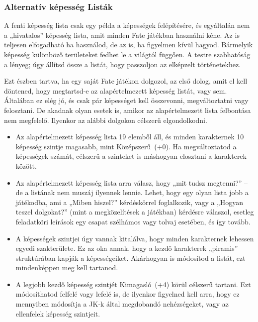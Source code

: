 \subsubsection{Alternatív képesség Listák}

A fenti képesség lista csak egy példa a képességek felépítésére, és egyáltalán nem a „hivatalos” képesség lista, amit minden Fate játékban használni kéne. Az is teljesen elfogadható ha használod, de az is, ha figyelmen kívül hagyod. Bármelyik képesség különböző területeket fedhet le a világtól függően. A testre szabhatóság a lényeg; úgy állítsd össze a listát, hogy passzoljon az elképzelt történetekhez.

Ezt észben tartva, ha egy saját Fate játékon dolgozol, az első dolog, amit el kell döntened, hogy megtartsd‑e az alapértelmezett képesség listát, vagy sem. Általában ez elég jó, és csak pár képességet kell összevonni, megváltoztatni vagy felosztani. De akadnak olyan esetek is, amikor az alapértelmezett lista felbontása nem megfelelő. Ilyenkor az alábbi dolgokon célszerű elgondolkodni.

\begin{itemize}
    \item Az alapértelmezett képesség lista 19 elemből áll, és minden karakternek 10 képesség szintje magasabb, mint Középszerű~(+0). Ha megváltoztatod a képességek számát, célszerű a szinteket is máshogyan elosztani a karakterek között.
    \item Az alapértelmezett képesség lista arra válasz, hogy „mit tudsz megtenni?” – de a listának nem muszáj ilyennek lennie. Lehet, hogy egy olyan lista jobb a játékodba, ami a „Miben hiszel?” kérdéskörrel foglalkozik, vagy a „Hogyan teszel dolgokat?” (mint a megközelítések a  játékban) kérdésre válaszol, esetleg feladatköri leírások egy csapat szélhámos vagy tolvaj esetében, és így tovább.
    \item A képességek szintjei úgy vannak kitalálva, hogy minden karakternek lehessen egyedi szakterülete. Ez az oka annak, hogy a kezdő karakterek „piramis” struktúrában kapják a képességeiket. Akárhogyan is módosítod a listát, ezt mindenképpen meg kell tartanod.
    \item A legjobb kezdő képesség szintjét Kimagasló~(+4) körül célszerű tartani. Ezt módosíthatod felfelé vagy lefelé is, de ilyenkor figyelned kell arra, hogy ez mennyiben módosítja a JK‑k által megdobandó nehézségeket, vagy az ellenfelek képesség szintjeit.
\end{itemize}

